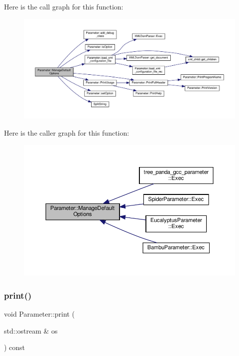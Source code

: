 Here is the call graph for this function\+:
\nopagebreak
\begin{figure}[H]
\begin{center}
\leavevmode
\includegraphics[width=350pt]{dc/dab/classParameter_acd65faa4f6d3fef6733d6d8a453854a0_cgraph}
\end{center}
\end{figure}
Here is the caller graph for this function\+:
\nopagebreak
\begin{figure}[H]
\begin{center}
\leavevmode
\includegraphics[width=350pt]{dc/dab/classParameter_acd65faa4f6d3fef6733d6d8a453854a0_icgraph}
\end{center}
\end{figure}
\mbox{\label{classParameter_a41a2f19a762dd1c83cb4eeebe8c2d55a}} 
\subsubsection{\texorpdfstring{print()}{print()}}
{\footnotesize\ttfamily void Parameter\+::print (\begin{DoxyParamCaption}\item[{std\+::ostream \&}]{os }\end{DoxyParamCaption}) const}



